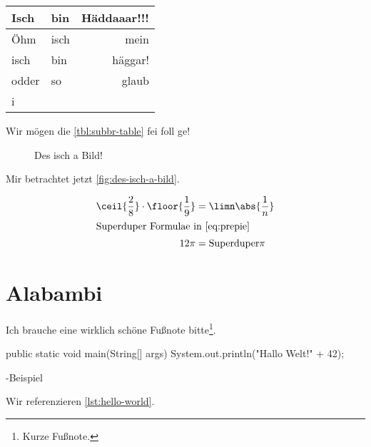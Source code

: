 \documentclass[userip,ngerman]{lecture-print}
\begin{document}
\begin{table}[H]
    \centering%
    \label{tbl:subbr-table}
    \begin{tabular}{llr}
        \toprule
            Isch & bin & Häddaaar!!! \\
        \midrule
            Öhm & isch & mein \\
            isch & bin & häggar!\\
            odder & so & glaub \\
            i \\
        \bottomrule
    \end{tabular}
\end{table}
Wir mögen die \autoref{tbl:subbr-table} fei foll ge!
\Blindtext[1]
\begin{figure*}
    \centering{}
    \caption[Des isch a breites Bild!]{Des isch a Bild!}
    \label{fig:des-isch-a-bild}
\end{figure*}
Mir betrachtet jetzt \autoref{fig:des-isch-a-bild}.
\Blindtext[1]
\begin{wide}
    \begin{align}
        \ceil{\frac{2}{8}} \cdot \floor{\frac{1}{9}}& = \limn\abs{\frac{1}{n}} \label{eq:prepie}\\
        \intertext{Superduper Formulae in \autoref{eq:prepie}}
        12 \pi &= \text{Superduper}\pi
    \end{align}
\end{wide}
\Blindtext[8]
\section{Alabambi}
Ich brauche eine wirklich schöne Fußnote bitte\footnote{Kurze Fußnote.}.
\begin{code*}
\centering\begin{minipage}{0.8\linewidth}
\begin{java}
public static void main(String[] args) {
    System.out.println("Hallo Welt!" + 42);
}
\end{java}
\end{minipage}
\caption{-Beispiel}
\label{lst:hello-world}
\end{code*}
Wir referenzieren \autoref{lst:hello-world}.
\Blindtext[6]
\end{document}
